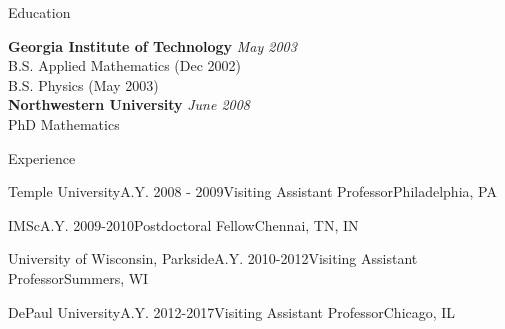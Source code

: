\documentclass{resume} %
\begin{document}

\begin{rSection}{Education}

{\bf Georgia Institute of Technology} \hfill {\em May 2003} \\ 
B.S. Applied Mathematics (Dec 2002)\\
B.S. Physics (May 2003) \smallskip \\

{\bf Northwestern University} \hfill {\em June 2008} \\ 
PhD Mathematics \\

\end{rSection}


\begin{rSection}{Experience}

\begin{rSubsection}{Temple University}{A.Y. 2008 - 2009}{Visiting Assistant Professor}{Philadelphia, PA}
\end{rSubsection}


\begin{rSubsection}{IMSc}{A.Y. 2009-2010}{Postdoctoral Fellow}{Chennai, TN, IN}
\end{rSubsection}


\begin{rSubsection}{University of Wisconsin, Parkside}{A.Y. 2010-2012}{Visiting Assistant Professor}{Summers, WI}
\indent
\end{rSubsection}


\begin{rSubsection}{DePaul University}{A.Y. 2012-2017}{Visiting Assistant Professor}{Chicago, IL}
\indent
\end{rSubsection}

\end{rSection}
\end{document}
